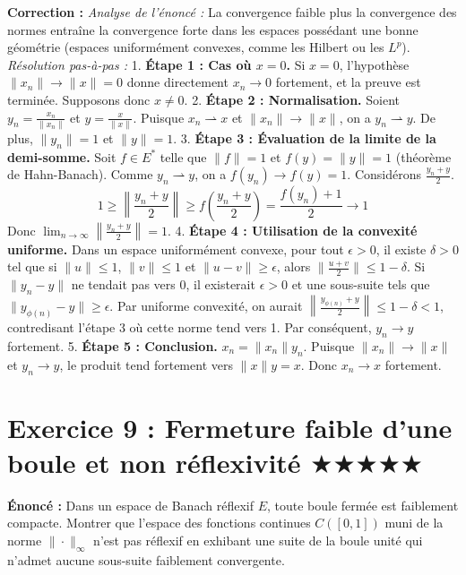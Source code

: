 \documentclass[11pt,a4paper]{article}
\begin{document}
\textbf{Correction :}
\textit{Analyse de l'énoncé :} La convergence faible plus la convergence des normes entraîne la convergence forte dans les espaces possédant une bonne géométrie (espaces uniformément convexes, comme les Hilbert ou les $L^p$).
\textit{Résolution pas-à-pas :}
1. \textbf{Étape 1 : Cas où $x = 0$.}
   Si $x = 0$, l'hypothèse $\|x_n\| \to \|x\| = 0$ donne directement $x_n \to 0$ fortement, et la preuve est terminée. Supposons donc $x \neq 0$.
2. \textbf{Étape 2 : Normalisation.}
   Soient $y_n = \frac{x_n}{\|x_n\|}$ et $y = \frac{x}{\|x\|}$.
   Puisque $x_n \rightharpoonup x$ et $\|x_n\| \to \|x\|$, on a $y_n \rightharpoonup y$.
   De plus, $\|y_n\| = 1$ et $\|y\| = 1$.
3. \textbf{Étape 3 : Évaluation de la limite de la demi-somme.}
   Soit $f \in E^*$ telle que $\|f\| = 1$ et $f(y) = \|y\| = 1$ (théorème de Hahn-Banach).
   Comme $y_n \rightharpoonup y$, on a $f(y_n) \to f(y) = 1$.
   Considérons $\frac{y_n + y}{2}$.
   $$1 \ge \left\| \frac{y_n + y}{2} \right\| \ge f\left( \frac{y_n + y}{2} \right) = \frac{f(y_n) + 1}{2} \to 1$$
   Donc $\lim_{n \to \infty} \left\| \frac{y_n + y}{2} \right\| = 1$.
4. \textbf{Étape 4 : Utilisation de la convexité uniforme.}
   Dans un espace uniformément convexe, pour tout $\epsilon > 0$, il existe $\delta > 0$ tel que si $\|u\| \le 1$, $\|v\| \le 1$ et $\|u - v\| \ge \epsilon$, alors $\| \frac{u+v}{2} \| \le 1 - \delta$.
   Si $\|y_n - y\|$ ne tendait pas vers 0, il existerait $\epsilon > 0$ et une sous-suite tels que $\|y_{\phi(n)} - y\| \ge \epsilon$.
   Par uniforme convexité, on aurait $\left\| \frac{y_{\phi(n)} + y}{2} \right\| \le 1 - \delta < 1$, contredisant l'étape 3 où cette norme tend vers 1.
   Par conséquent, $y_n \to y$ fortement.
5. \textbf{Étape 5 : Conclusion.}
   $x_n = \|x_n\| y_n$. Puisque $\|x_n\| \to \|x\|$ et $y_n \to y$, le produit tend fortement vers $\|x\|y = x$. Donc $x_n \to x$ fortement.


\section{Exercice 9 : Fermeture faible d'une boule et non réflexivité \quad $\bigstar\bigstar\bigstar\bigstar\bigstar$}

\textbf{Énoncé :}
Dans un espace de Banach réflexif $E$, toute boule fermée est faiblement compacte. Montrer que l'espace des fonctions continues $C([0, 1])$ muni de la norme $\| \cdot \|_\infty$ n'est pas réflexif en exhibant une suite de la boule unité qui n'admet aucune sous-suite faiblement convergente.
\end{document}
